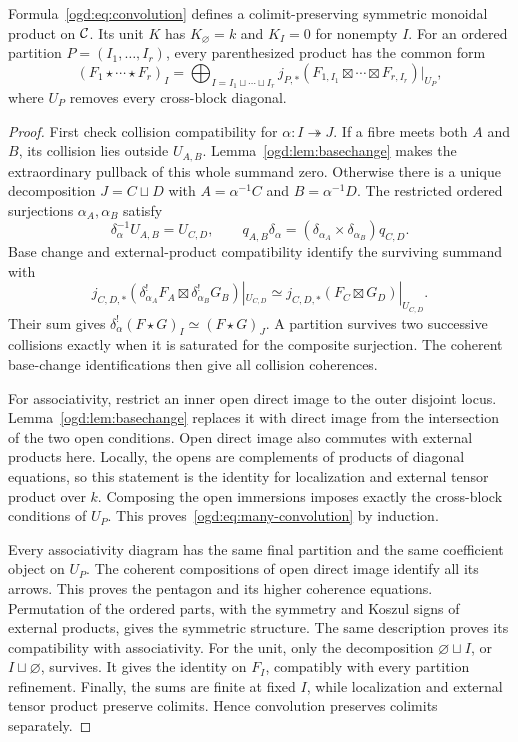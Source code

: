 \begin{theorem}\label{ogd:thm:convolution}
Formula~\eqref{ogd:eq:convolution} defines a colimit-preserving symmetric monoidal product on \(\mathcal C\).
Its unit \(K\) has \(K_\varnothing=k\) and \(K_I=0\) for nonempty \(I\).
For an ordered partition \(P=(I_1,\ldots,I_r)\), every parenthesized product has the common form
\begin{equation}\label{ogd:eq:many-convolution}
 (F_1\star\cdots\star F_r)_I=
 \bigoplus_{I=I_1\sqcup\cdots\sqcup I_r}
 j_{P,*}(F_{1,I_1}\boxtimes\cdots\boxtimes F_{r,I_r})|_{U_P},
\end{equation}
where \(U_P\) removes every cross-block diagonal.
\end{theorem}
\begin{proof}
First check collision compatibility for \(\alpha:I\twoheadrightarrow J\).
If a fibre meets both \(A\) and \(B\), its collision lies outside \(U_{A,B}\).
Lemma~\ref{ogd:lem:basechange} makes the extraordinary pullback of this whole summand zero.
Otherwise there is a unique decomposition \(J=C\sqcup D\) with
\(A=\alpha^{-1}C\) and \(B=\alpha^{-1}D\).
The restricted ordered surjections \(\alpha_A,\alpha_B\) satisfy
\[
 \delta_\alpha^{-1}U_{A,B}=U_{C,D},\qquad
 q_{A,B}\delta_\alpha=(\delta_{\alpha_A}\times\delta_{\alpha_B})q_{C,D}.
\]
Base change and external-product compatibility identify the surviving summand with
\[
 j_{C,D,*}(\delta_{\alpha_A}^!F_A\boxtimes
                     \delta_{\alpha_B}^!G_B)|_{U_{C,D}}
 \simeq j_{C,D,*}(F_C\boxtimes G_D)|_{U_{C,D}}.
\]
Their sum gives \(\delta_\alpha^!(F\star G)_I\simeq(F\star G)_J\).
A partition survives two successive collisions exactly when it is saturated for the composite surjection.
The coherent base-change identifications then give all collision coherences.

For associativity, restrict an inner open direct image to the outer disjoint locus.
Lemma~\ref{ogd:lem:basechange} replaces it with direct image from the intersection of the two open conditions.
Open direct image also commutes with external products here.
Locally, the opens are complements of products of diagonal equations, so this statement is the identity for localization and external tensor product over \(k\).
Composing the open immersions imposes exactly the cross-block conditions of \(U_P\).
This proves~\eqref{ogd:eq:many-convolution} by induction.

Every associativity diagram has the same final partition and the same coefficient object on \(U_P\).
The coherent compositions of open direct image identify all its arrows.
This proves the pentagon and its higher coherence equations.
Permutation of the ordered parts, with the symmetry and Koszul signs of external products, gives the symmetric structure.
The same description proves its compatibility with associativity.
For the unit, only the decomposition \(\varnothing\sqcup I\), or \(I\sqcup\varnothing\), survives.
It gives the identity on \(F_I\), compatibly with every partition refinement.
Finally, the sums are finite at fixed \(I\), while localization and external tensor product preserve colimits.
Hence convolution preserves colimits separately.
\end{proof}

